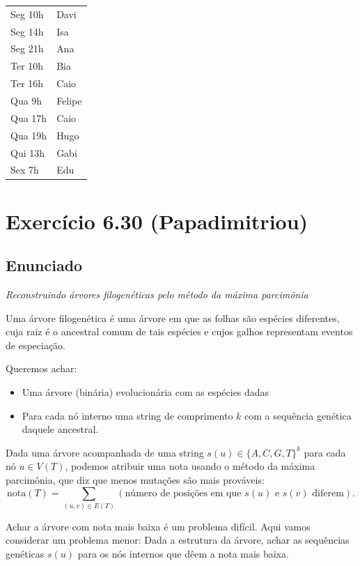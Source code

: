 \documentclass[11pt]{article}
\begin{document}
\begin{center}
\begin{tabular}{ll}
Seg 10h & Davi\\
Seg 14h & Isa\\
Seg 21h & Ana\\
Ter 10h & Bia\\
Ter 16h & Caio\\
Qua 9h & Felipe\\
Qua 17h & Caio\\
Qua 19h & Hugo\\
Qui 13h & Gabi\\
Sex 7h & Edu\\
\end{tabular}
\end{center}

\section{Exercício 6.30 (Papadimitriou)}
\label{sec-2}

\subsection{Enunciado}
\label{sec-2-1}

\textit{Reconstruindo árvores filogenéticas pelo método da máxima parcimônia}

Uma árvore filogenética é uma árvore em que as folhas são espécies
diferentes, cuja raiz é o ancestral comum de tais espécies e cujos
galhos representam eventos de especiação.

Queremos achar:

\begin{itemize}
\item Uma árvore (binária) evolucionária com as espécies dadas
\item Para cada nó interno uma string de comprimento $k$ com a
sequência genética daquele ancestral.
\end{itemize}


Dada uma árvore acompanhada de uma string $s(u) \in \{A, C, G, T\}^k$ para
cada nó $u \in V(T)$, podemos atribuir uma nota usando o método da
máxima parcimônia, que diz que menos mutações são mais prováveis:
\[ \mathrm{nota}(T) = \sum_{(u,v) \in E(T)} (\text{número de posições em que }s(u)\text{ e }s(v)\text{ diferem}). \]

Achar a árvore com nota mais baixa é um problema difícil. Aqui vamos
considerar um problema menor: Dada a estrutura da árvore, achar as
sequências genéticas $s(u)$ para os nós internos que dêem a nota mais
baixa.
\end{document}
